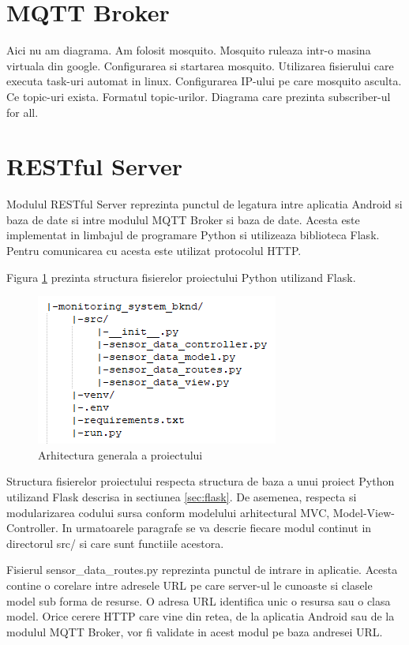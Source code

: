 \section{MQTT Broker}\label{sec:pi_mqttbroker}
Aici nu am diagrama.
Am folosit mosquito.
Mosquito ruleaza intr-o masina virtuala din google.
Configurarea si startarea mosquito.
Utilizarea fisierului care executa task-uri automat in linux.
Configurarea IP-ului pe care mosquito asculta.
Ce topic-uri exista. Formatul topic-urilor.
Diagrama care prezinta subscriber-ul for all.

\section{RESTful Server}\label{sec:pi_restserver}
Modulul RESTful Server reprezinta punctul de legatura intre aplicatia Android si baza de date si intre modulul MQTT Broker si baza de date. Acesta este implementat in limbajul 
de programare Python si utilizeaza biblioteca Flask. Pentru comunicarea cu acesta este utilizat protocolul HTTP. 

Figura \ref{fig:PI_RealFlaskProjectStructure} prezinta structura fisierelor proiectului Python utilizand Flask. 
\begin{figure}[H]
    \centering
    \includegraphics[scale=0.9]{figs/PI_RealFlaskProjectStructure.png}
    \caption{Arhitectura generala a proiectului}
    \label{fig:PI_RealFlaskProjectStructure}
\end{figure}

Structura fisierelor proiectului respecta structura de baza a unui proiect Python utilizand Flask descrisa in sectiunea \ref{sec:flask}. De asemenea, respecta si 
modularizarea codului sursa conform modelului arhitectural MVC, Model-View-Controller. In urmatoarele paragrafe se va descrie fiecare modul continut in directorul 
src/ si care sunt functiile acestora.

Fisierul sensor\_data\_routes.py reprezinta punctul de intrare in aplicatie. Acesta contine o corelare intre adresele URL pe care server-ul le cunoaste si clasele model 
sub forma de resurse. O adresa URL identifica unic o resursa sau o clasa model. Orice cerere HTTP care vine din retea, de la aplicatia Android sau de la modulul MQTT Broker, 
vor fi validate in acest modul pe baza andresei URL.

